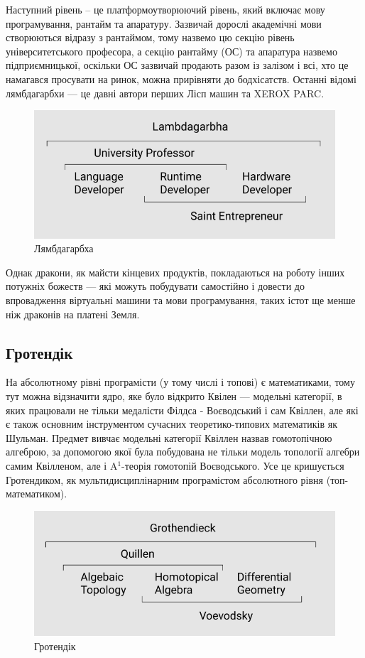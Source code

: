 Наступний рівень -- це платформоутворюючий рівень,
який включає мову програмування, рантайм та апаратуру.
Зазвичай дорослі академічні мови створюються відразу з
рантаймом, тому назвемо цю секцію рівень університетського
професора, а секцію рантайму (ОС) та апаратура назвемо
підприємницької, оскільки ОС зазвичай продають разом
із залізом і всі, хто це намагався просувати на ринок,
можна прирівняти до бодхісатств. Останні відомі лямбдагарбхи ---
це давні автори перших Лісп машин та XEROX PARC.

\begin{figure}[!htbp]
\centerline{\includegraphics[scale=0.46]{lambdagarbha.PNG}}
\caption{Лямбдагарбха}
\end{figure}

Однак дракони, як майсти кінцевих продуктів, покладаються
на роботу інших потужніх божеств --- які можуть побудувати
самостійно і довести до впровадження віртуальні машини та
мови програмування, таких істот ще менше ніж драконів на платені Земля.

\newpage
\subsection{Гротендік}

На абсолютному рівні програмісти (у тому числі і топові) є
математиками, тому тут можна відзначити ядро, яке було відкрито
Квілен — модельні категорії, в яких працювали не тільки
медалісти Філдса - Воєводський і сам Квіллен, але які є
також основним інструментом сучасних теоретико-типових математиків
як Шульман. Предмет вивчає модельні категорії Квіллен назвав
гомотопічною алгеброю, за допомогою якої була побудована не
тільки модель топології алгебри самим Квілленом, але і A$^1$-теорія
гомотопій Воєводського. Усе це кришується Гротендиком, як
мультидисциплінарним програмістом абсолютного рівня (топ-математиком).

\begin{figure}[!htbp]
\centerline{\includegraphics[scale=0.46]{grothendieck.PNG}}
\caption{Гротендік}
\end{figure}

